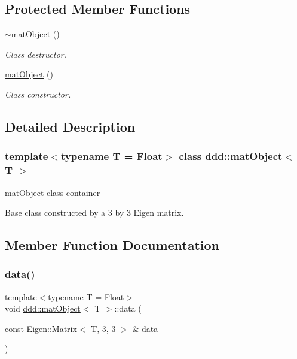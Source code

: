 \subsection*{Protected Member Functions}
\begin{DoxyCompactItemize}
\item 
\mbox{\label{classddd_1_1mat_object_a625d6a7219aa9fc78ef93901187b75ca}} 
\hyperlink{classddd_1_1mat_object_a625d6a7219aa9fc78ef93901187b75ca}{$\sim$mat\+Object} ()
\begin{DoxyCompactList}\small\item\em Class destructor. \end{DoxyCompactList}\item 
\mbox{\label{classddd_1_1mat_object_a803ad1602c813d9f1476f9d6e087005a}} 
\hyperlink{classddd_1_1mat_object_a803ad1602c813d9f1476f9d6e087005a}{mat\+Object} ()
\begin{DoxyCompactList}\small\item\em Class constructor. \end{DoxyCompactList}\end{DoxyCompactItemize}


\subsection{Detailed Description}
\subsubsection*{template$<$typename T = Float$>$\newline
class ddd\+::mat\+Object$<$ T $>$}

\hyperlink{classddd_1_1mat_object}{mat\+Object} class container 

Base class constructed by a 3 by 3 Eigen matrix. 

\subsection{Member Function Documentation}
\mbox{\label{classddd_1_1mat_object_a5bff8ef1182818135f4b82e978ff3bbf}} 
\subsubsection{\texorpdfstring{data()}{data()}}
{\footnotesize\ttfamily template$<$typename T  = Float$>$ \\
void \hyperlink{classddd_1_1mat_object}{ddd\+::mat\+Object}$<$ T $>$\+::data (\begin{DoxyParamCaption}\item[{const Eigen\+::\+Matrix$<$ T, 3, 3 $>$ \&}]{data }\end{DoxyParamCaption})\hspace{0.3cm}{\ttfamily [inline]}}



